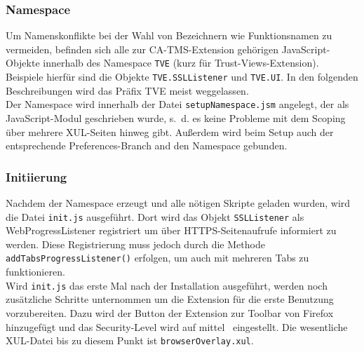 \documentclass[accentcolor=tud1c,article,colorback,11pt]{tudreport}
\begin{document}
\subsubsection{Namespace}
Um Namenskonflikte bei der Wahl von Bezeichnern wie Funktionsnamen zu vermeiden, befinden sich alle zur CA-TMS-Extension gehörigen JavaScript-Objekte innerhalb des Namespace \texttt{TVE} (kurz für Trust-Views-Extension). Beispiele hierfür sind die Objekte \texttt{TVE.SSLListener} und \texttt{TVE.UI}. In den folgenden Beschreibungen wird das Präfix TVE meist weggelassen.\\
Der Namespace wird innerhalb der Datei \texttt{setupNamespace.jsm} angelegt, der als JavaScript-Modul \cite{jsm} geschrieben wurde, s.~d. es keine Probleme mit dem Scoping über mehrere XUL-Seiten hinweg gibt. Außerdem wird beim Setup auch der entsprechende Preferences-Branch and den Namespace gebunden.

\subsubsection{Initiierung}
Nachdem der Namespace erzeugt und alle nötigen Skripte geladen wurden, wird die Datei \texttt{init.js} ausgeführt. Dort wird das Objekt \texttt{SSLListener} als WebProgressListener registriert um über HTTPS-Seitenaufrufe informiert zu werden. Diese Registrierung muss jedoch durch die Methode \texttt{addTabsProgressListener()} \cite{allTabs} erfolgen, um auch mit mehreren Tabs zu funktionieren.\\
Wird \texttt{init.js} das erste Mal nach der Installation ausgeführt, werden noch zusätzliche Schritte unternommen um die Extension für die erste Benutzung vorzubereiten. Dazu wird der Button der Extension zur Toolbar von Firefox hinzugefügt und das Security-Level wird auf \glqq mittel\grqq~ eingestellt. Die wesentliche XUL-Datei bis zu diesem Punkt ist \texttt{browserOverlay.xul}.
\end{document}
